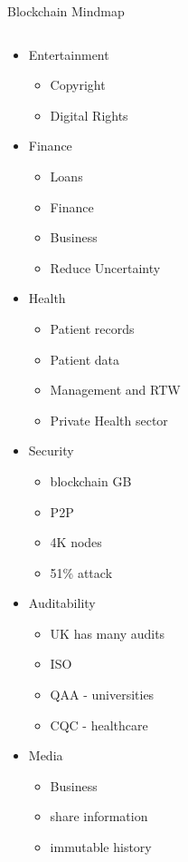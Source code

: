 \documentclass[pdf,table]{beamer}
\begin{document}
\begin{frame}{Blockchain Mindmap}
\begin{columns}[T]
\begin{column}{0.4\textwidth}
\begin{itemize}
		\item<7|only@7> Entertainment
			\begin{itemize}
				\item Copyright
				\item Digital Rights
			\end{itemize}
		\item<8|only@8> Finance
			\begin{itemize}
				\item Loans
				\item Finance
				\item Business
				\item Reduce Uncertainty
			\end{itemize}
		\item<9|only@9> Health
			\begin{itemize}
				\item Patient records
				\item Patient data
				\item Management and RTW
				\item Private Health sector 
			\end{itemize}
		\item<10|only@10> Security
			\begin{itemize}
				\item blockchain GB
				\item P2P
				\item 4K nodes
				\item 51\% attack 
			\end{itemize}
		\item<11|only@11> Auditability
			\begin{itemize}
				\item UK has many audits
				\item ISO 
				\item QAA - universities
				\item CQC - healthcare
			\end{itemize}
		\item<12|only@12> Media
			\begin{itemize}
				\item Business
				\item share information
				\item immutable history
			\end{itemize}
		\end{itemize}
	\end{column}
\end{columns}
\end{frame}
\end{document}
